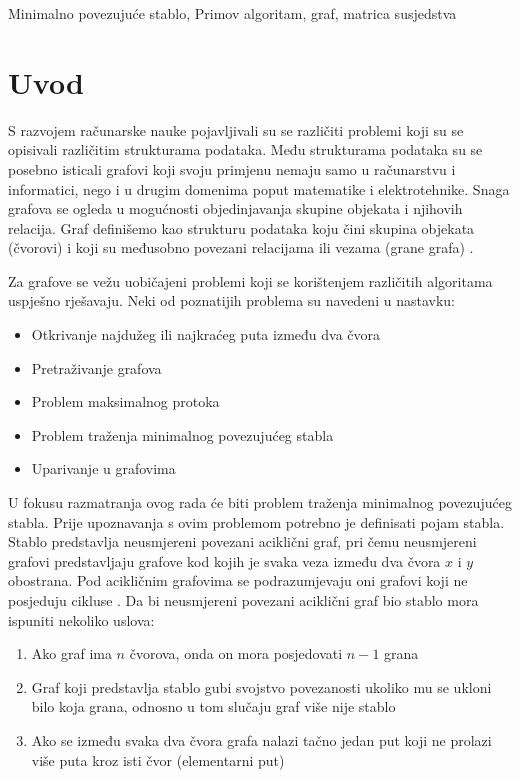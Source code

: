 \documentclass[conference]{IEEEtran}
\begin{document}
\begin{IEEEkeywords}
Minimalno povezujuće stablo, Primov algoritam, graf, matrica susjedstva
\end{IEEEkeywords}

\section{Uvod}


S razvojem računarske nauke pojavljivali su se različiti problemi koji su se opisivali različitim  strukturama podataka. Među strukturama podataka su se posebno isticali grafovi koji svoju primjenu nemaju samo u računarstvu i informatici, nego i u drugim domenima poput matematike i elektrotehnike.
Snaga grafova se ogleda u mogućnosti objedinjavanja skupine objekata i njihovih relacija. Graf definišemo kao strukturu podataka koju čini skupina objekata (čvorovi) i koji su međusobno povezani relacijama ili vezama (grane grafa) \cite{b1}.

Za grafove se vežu uobičajeni problemi koji se korištenjem različitih algoritama uspješno rješavaju. Neki od poznatijih problema su navedeni u nastavku:

\begin{itemize}
    \item Otkrivanje najdužeg ili najkraćeg puta između dva čvora
    \item Pretraživanje grafova
    \item Problem maksimalnog protoka
    \item Problem traženja minimalnog povezujućeg stabla
    \item Uparivanje u grafovima
\end{itemize}

U fokusu razmatranja ovog rada će biti problem traženja minimalnog povezujućeg stabla. Prije upoznavanja s ovim problemom potrebno je definisati pojam stabla. Stablo predstavlja neusmjereni povezani aciklični graf, pri čemu neusmjereni grafovi predstavljaju grafove kod kojih je svaka veza između dva čvora $x$ i $y$ obostrana. Pod acikličnim grafovima se podrazumjevaju oni grafovi koji ne posjeduju cikluse \cite{b2}. Da bi neusmjereni povezani aciklični graf bio stablo mora ispuniti nekoliko uslova:

\begin{enumerate}
    \item Ako graf ima $n$ čvorova, onda on mora posjedovati $n-1$ grana
    \item Graf koji predstavlja stablo gubi svojstvo povezanosti ukoliko mu se ukloni bilo koja grana, odnosno u tom slučaju graf više nije stablo
    \item Ako se između svaka dva čvora grafa nalazi tačno jedan put koji ne prolazi više puta kroz isti čvor (elementarni put)
\end{enumerate}
\end{document}
